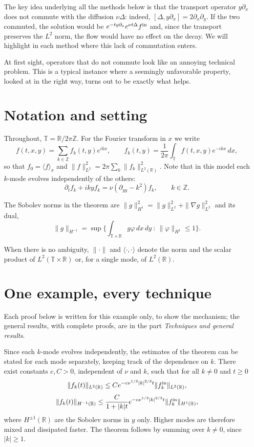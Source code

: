 \documentclass[11pt]{article}
\makeatletter
\theoremstyle{definition}
\theoremstyle{remark}
\newcommand{\ed@runin}[1]{\par\topsep6\p@\@plus6\p@\relax\trivlist\item[\hskip\labelsep\itshape#1\@addpunct{.}]\ignorespaces}
\newenvironment{idea}[1][Idea]{\ed@runin{#1}}{\endtrivlist\@endpefalse}
\newenvironment{note}[1][Note]{\begin{tcolorbox}[ed@note]\noindent{\itshape#1\@addpunct{.}}\enspace\ignorespaces}{\end{tcolorbox}}
\makeatother
\begin{document}
\begin{idea}
The key idea underlying all the methods below is that the transport operator $y\partial_x$ does not commute with the diffusion $\nu\Delta$: indeed, $[\Delta,y\partial_x]=2\partial_x\partial_y$. If the two commuted, the solution would be $e^{-ty\partial_x}e^{\nu t\Delta}f^{\rm in}$ and, since the transport preserves the $L^2$ norm, the flow would have no effect on the decay. We will highlight in each method where this lack of commutation enters.

At first sight, operators that do not commute look like an annoying technical problem. This is a typical instance where a seemingly unfavorable property, looked at in the right way, turns out to be exactly what helps.
\end{idea}
\section{Notation and setting}
Throughout, $\mathbb{T}=\mathbb{R}/2\pi\mathbb{Z}$. For the Fourier transform in $x$ we write
\[f(t,x,y)=\sum_{k\in\mathbb{Z}}f_k(t,y)e^{ikx},\qquad f_k(t,y)=\frac{1}{2\pi}\int_{\mathbb{T}}f(t,x,y)e^{-ikx}\,dx,\]
so that $f_0=\langle f\rangle_x$ and $\|f\|_{L^2}^2=2\pi\sum_{k}\|f_k\|_{L^2(\mathbb{R})}^2$. Note that in this model each $k$-mode evolves independently of the others:
\[\partial_tf_k+ikyf_k=\nu(\partial_{yy}-k^2)f_k,\qquad k\in\mathbb{Z}.\]

The Sobolev norms in the theorem are $\|g\|_{H^1}^2=\|g\|_{L^2}^2+\|\nabla g\|_{L^2}^2$ and its dual,
\[\|g\|_{H^{-1}}=\sup\Big\{\int_{\mathbb{T}\times\mathbb{R}}g\varphi\,dx\,dy\ :\ \|\varphi\|_{H^1}\leq1\Big\}.\]

When there is no ambiguity, $\|\cdot\|$ and $\langle\cdot,\cdot\rangle$ denote the norm and the scalar product of $L^2(\mathbb{T}\times\mathbb{R})$ or, for a single mode, of $L^2(\mathbb{R})$.

\section{One example, every technique}
Each proof below is written for this example only, to show the mechanism; the general results, with complete proofs, are in the part \emph{Techniques and general results}.

\begin{note}[The estimates mode by mode]
Since each $k$-mode evolves independently, the estimates of the theorem can be stated for each mode separately, keeping track of the dependence on $k$. There exist constants $c,C>0$, independent of $\nu$ and $k$, such that for all $k\neq0$ and $t\geq0$
\[\|f_k(t)\|_{L^2(\mathbb{R})}\leq Ce^{-c\nu^{1/3}|k|^{2/3}t}\|f_k^{\rm in}\|_{L^2(\mathbb{R})},\]
\[\|f_k(t)\|_{H^{-1}(\mathbb{R})}\leq\frac{C}{1+|k|t}e^{-c\nu^{1/3}|k|^{2/3}t}\|f_k^{\rm in}\|_{H^{1}(\mathbb{R})},\]
where $H^{\pm1}(\mathbb{R})$ are the Sobolev norms in $y$ only. Higher modes are therefore mixed and dissipated faster. The theorem follows by summing over $k\neq0$, since $|k|\geq1$.
\end{note}
\end{document}
